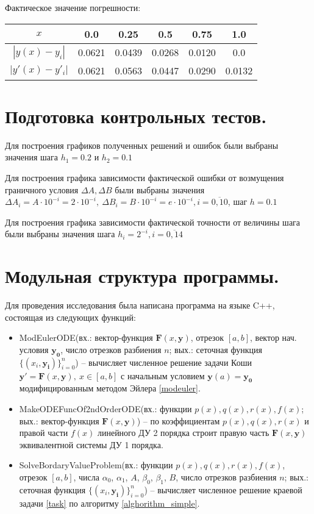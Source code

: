 \documentclass[a4paper, 12pt]{article}
\begin{document}
	Фактическое значение погрешности:
	\begin{center}
	\begin{tabular}{| c | c | c | c | c | c |}
		\hline
		$x$ & 0.0 & 0.25 & 0.5 & 0.75 & 1.0\\ \hline
		$|y(x)-y_i|$ & 0.0621 & 0.0439 & 0.0268 & 0.0120 & 0.0\\ \hline
		$|y'(x)-y'_i|$ & 0.0621 & 0.0563 & 0.0447 & 0.0290 & 0.0132\\ \hline
	\end{tabular}
	\end{center}
	
	\section{Подготовка контрольных тестов.}
	
	Для построения графиков полученных решений и ошибок были выбраны значения шага $h_1=0.2$ и $h_2=0.1$
	
	Для построения графика зависимости фактической ошибки от возмущения граничного условия $\Delta A, \Delta B$ были выбраны значения $\Delta A_i=A\cdot10^{-i}=2\cdot10^{-i},\ \Delta B_i=B\cdot 10^{-i}=e\cdot 10^{-i}, i=\overline{0,10}$, шаг $h=0.1$
	
	Для построения графика зависимости фактической точности от величины шага были выбраны значения шага $h_i=2^{-i}, i=\overline{0,14}$
	
	\section{Модульная структура программы.}
	Для проведения исследования была написана программа на языке C++, состоящая из следующих функций:
	\begin{itemize}
		\item ModEulerODE(вх.: вектор-функция $\mathbf{F}(x,\mathbf{y})$, отрезок $[a,b]$, вектор нач. условия $\mathbf{y_0}$, число отрезков разбиения $n$; вых.: сеточная функция $\{(x_i,\mathbf{y_i})\}_{i=0}^n$) -- вычисляет численное решение задачи Коши $\mathbf{y'}=\mathbf{F}(x,\mathbf{y}),\ x\in[a,b]$ с начальным условием $\mathbf{y}(a)=\mathbf{y_0}$ модифицированным методом Эйлера \eqref{modeuler}.
		\item MakeODEFuncOf2ndOrderODE(вх.: функции $p(x),q(x),r(x),f(x)$; вых.: вектор-функция $\mathbf{F}(x,\mathbf{y})$) -- по коэффициентам $p(x),q(x),r(x)$ и правой части $f(x)$ линейного ДУ 2 порядка строит правую часть $\mathbf{F}(x,\mathbf{y})$ эквивалентной системы ДУ 1 порядка.
		\item SolveBordaryValueProblem(вх.: функции $p(x),q(x),r(x),f(x)$, отрезок $[a,b]$, числа $\alpha_0$, $\alpha_1$, $A$, $\beta_0$, $\beta_1$, $B$, число отрезков разбиения $n$; вых.: сеточная функция $\{(x_i,\mathbf{y_i})\}_{i=0}^n$) -- вычисляет численное решение краевой задачи \eqref{task} по алгоритму \ref{alghorithm_simple}.
	\end{itemize}
	
\end{document}
